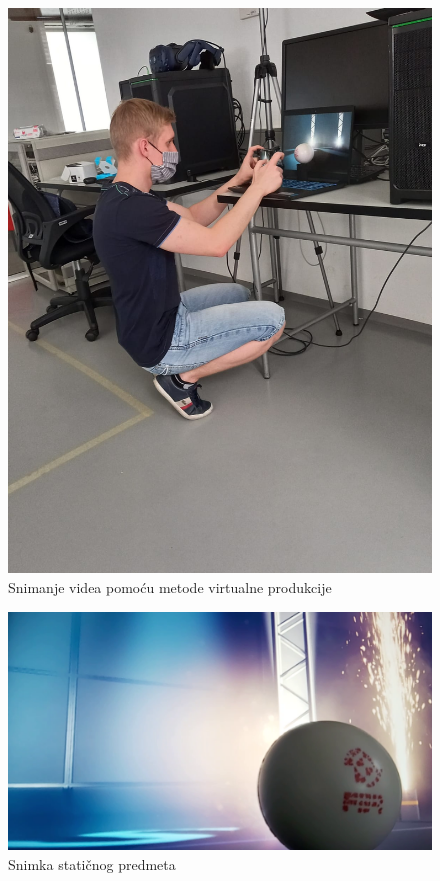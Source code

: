\documentclass[times, utf8, zavrsni, numeric]{fer}
\begin{document}
\begin{figure}[htp]
	\centering
	\includegraphics[width=\linewidth]{slika 7-1.jpg}
	\caption{Snimanje videa pomoću metode virtualne produkcije}
	\label{fig:slika 7-1}
\end{figure}

\begin{figure}[htp]
	\centering
	\includegraphics[width=\linewidth]{slika 7-2.png}
	\caption{Snimka statičnog predmeta}
	\label{fig:slika 7-2}
\end{figure}
\end{document}
